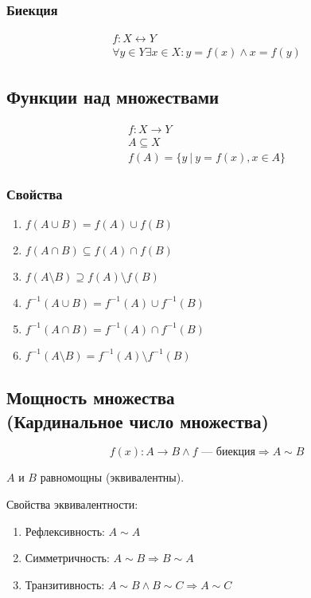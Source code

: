 \documentclass{article}
\begin{document}
\subsubsection{Биекция}
\begin{gather*}
	f : X \leftrightarrow Y \\
	\forall y \in Y \exists x \in X : y = f(x) \land x = f(y)
\end{gather*}

\subsection{Функции над множествами}
\begin{gather*}
	f: X \to Y \\
	A \subseteq X \\
	f(A) = \{y\ |\ y = f(x), x \in A\}
\end{gather*}

\subsubsection{Свойства}

\begin{enumerate}
	\item $f(A \cup B) = f(A) \cup f(B)$
	\item $f(A \cap B) \subseteq f(A) \cap f(B)$
	\item $f(A \setminus B) \supseteq f(A) \setminus f(B)$
	\item $f^{-1}(A \cup B) = f^{-1}(A) \cup f^{-1}(B)$
	\item $f^{-1}(A \cap B) = f^{-1}(A) \cap f^{-1}(B)$
	\item $f^{-1}(A \setminus B) = f^{-1}(A) \setminus f^{-1}(B)$
\end{enumerate}

\subsection{Мощность множества \\
(Кардинальное число множества)}

\[
f(x): A \to B \land f \text{ --- биекция} \Rightarrow A \sim B
\]

$A$ и $B$ равномощны (эквивалентны).

Свойства эквивалентности:

\begin{enumerate}
	\item Рефлексивность: $A \sim A$
	\item Симметричность: $A \sim B \Rightarrow B \sim A$
	\item Транзитивность: $A \sim B \land B \sim C \Rightarrow A \sim C$
\end{enumerate}
\end{document}
